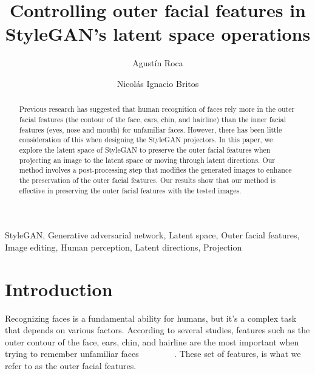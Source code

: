 \documentclass[review]{elsarticle}
\begin{document}
\begin{frontmatter}

\title{Controlling outer facial features in StyleGAN's latent space operations}

\author[1]{Agustín Roca}

\author[1]{Nicolás Ignacio Britos}



\begin{abstract}

Previous research has suggested that human recognition of faces rely more in the outer facial features (the contour of the face, ears, chin, and hairline) than the inner facial features (eyes, nose and mouth) for unfamiliar faces. However, there has been little consideration of this when designing the StyleGAN projectors. In this paper, we explore the latent space of StyleGAN to preserve the outer facial features when projecting an image to the latent space or moving through latent directions. Our method involves a post-processing step that modifies the generated images to enhance the preservation of the outer facial features. Our results show that our method is effective in preserving the outer facial features with the tested images.

\end{abstract}

\begin{keyword}
StyleGAN, Generative adversarial network, Latent space, Outer facial features, Image editing, Human perception, Latent directions, Projection
\end{keyword}

\end{frontmatter}

\linenumbers 

\section{Introduction}

Recognizing faces is a fundamental ability for humans, but it's a complex task that depends on various factors. According to several studies, features such as the outer contour of the face, ears, chin, and hairline are the most important when trying to remember unfamiliar faces ~\cite{Want_2003} ~\cite{Young_1985} ~\cite{Bruce_1999} ~\cite{Ellis_1979}  ~\cite{Hancock_2000}. These set of features, is what we refer to as the outer facial features.
\end{document}
